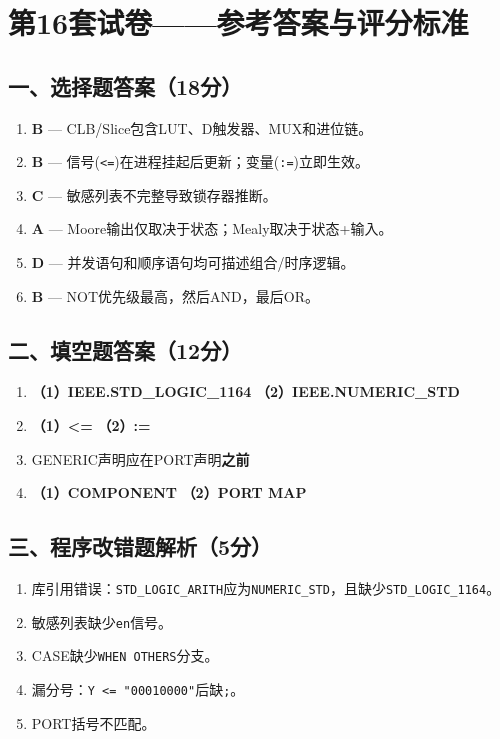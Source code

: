 \chapter{第16套试卷——参考答案与评分标准}

\section{一、选择题答案（18分）}

\begin{enumerate}[label=\arabic*.]
\item \textbf{B} — CLB/Slice包含LUT、D触发器、MUX和进位链。
\item \textbf{B} — 信号(\texttt{<=})在进程挂起后更新；变量(\texttt{:=})立即生效。
\item \textbf{C} — 敏感列表不完整导致锁存器推断。
\item \textbf{A} — Moore输出仅取决于状态；Mealy取决于状态+输入。
\item \textbf{D} — 并发语句和顺序语句均可描述组合/时序逻辑。
\item \textbf{B} — NOT优先级最高，然后AND，最后OR。
\end{enumerate}

\section{二、填空题答案（12分）}

\begin{enumerate}[label=\arabic*.]
\item \textbf{（1）IEEE.STD\_LOGIC\_1164} \quad \textbf{（2）IEEE.NUMERIC\_STD}
\item \textbf{（1）<=} \quad \textbf{（2）:=}
\item GENERIC声明应在PORT声明\textbf{之前}
\item \textbf{（1）COMPONENT} \quad \textbf{（2）PORT MAP}
\end{enumerate}

\section{三、程序改错题解析（5分）}

\begin{enumerate}[label=错误\arabic*：]
\item 库引用错误：\texttt{STD\_LOGIC\_ARITH}应为\texttt{NUMERIC\_STD}，且缺少\texttt{STD\_LOGIC\_1164}。
\item 敏感列表缺少\texttt{en}信号。
\item CASE缺少\texttt{WHEN OTHERS}分支。
\item 漏分号：\texttt{Y <= "00010000"}后缺\texttt{;}。
\item PORT括号不匹配。
\end{enumerate}

